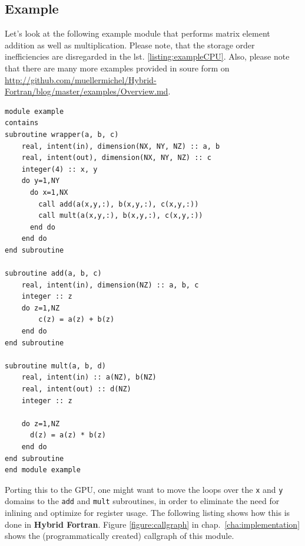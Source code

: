 \subsection{Example} \label{sub:directiveExample}

Let's look at the following example module that performs matrix element addition as well as multiplication. Please note, that the storage order inefficiencies are disregarded in the lst. \ref{listing:exampleCPU}. Also, please note that there are many more examples provided in soure form on \url{http://github.com/muellermichel/Hybrid-Fortran/blog/master/examples/Overview.md}.

\begin{lstlisting}[name=exampleCPU, label=listing:exampleCPU, caption={CPU version of matrix element module}]
module example
contains
subroutine wrapper(a, b, c)
    real, intent(in), dimension(NX, NY, NZ) :: a, b
    real, intent(out), dimension(NX, NY, NZ) :: c
    integer(4) :: x, y
    do y=1,NY
      do x=1,NX
        call add(a(x,y,:), b(x,y,:), c(x,y,:))
        call mult(a(x,y,:), b(x,y,:), c(x,y,:))
      end do
    end do
end subroutine

subroutine add(a, b, c)
    real, intent(in), dimension(NZ) :: a, b, c
    integer :: z
    do z=1,NZ
        c(z) = a(z) + b(z)
    end do
end subroutine

subroutine mult(a, b, d)
    real, intent(in) :: a(NZ), b(NZ)
    real, intent(out) :: d(NZ)
    integer :: z

    do z=1,NZ
      d(z) = a(z) * b(z)
    end do
end subroutine
end module example
\end{lstlisting}

Porting this to the GPU, one might want to move the loops over the \verb|x| and \verb|y| domains to the \verb|add| and \verb|mult| subroutines, in order to eliminate the need for inlining and optimize for register usage. The following listing shows how this is done in \textbf{Hybrid Fortran}. Figure \ref{figure:callgraph} in chap.~\ref{cha:implementation} shows the (programmatically created) callgraph of this module.

